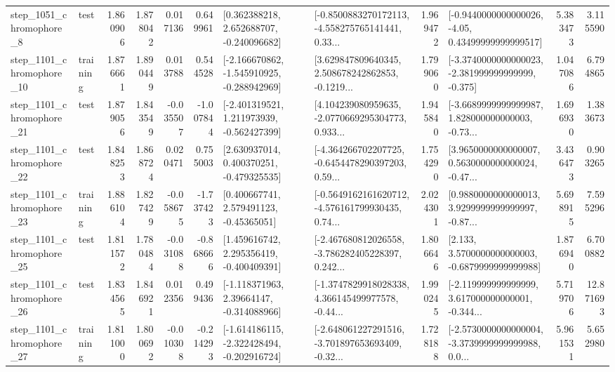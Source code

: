 \begin{tabular}{llrrrrllrlrr}
  step\_1051\_chromophore\_8 &      test &      1.860906 &    1.878042 &      0.017136 &  0.649961 &    [0.362388218, 2.652688707, -0.240096682] &  [-0.8500883270172113, -4.558275765141441, 0.33... &       1.969472 &  [-0.9440000000000026, -4.05, 0.43499999999999517] &            5.383473 &          3.115590 \\
 step\_1101\_chromophore\_10 &  training &      1.876661 &    1.890449 &      0.013788 &  0.544528 &  [-2.166670862, -1.545910925, -0.288942969] &  [3.629847809640345, 2.508678242862853, -0.1219... &       1.799060 &  [-3.3740000000000023, -2.381999999999999, -0.375] &            1.047086 &          6.794865 \\
 step\_1101\_chromophore\_21 &      test &      1.879056 &    1.843549 &     -0.035507 & -1.007844 &   [-2.401319521, 1.211973939, -0.562427399] &  [4.104239080959635, -2.0770669295304773, 0.933... &       1.945840 &  [-3.6689999999999987, 1.828000000000003, -0.73... &            1.696930 &          1.383673 \\
 step\_1101\_chromophore\_22 &      test &      1.848253 &    1.868724 &      0.020471 &  0.755003 &    [2.630937014, 0.400370251, -0.479325535] &  [-4.364266702207725, -0.6454478290397203, 0.59... &       1.754290 &  [3.9650000000000007, 0.5630000000000024, -0.47... &            3.436473 &          0.903265 \\
 step\_1101\_chromophore\_23 &  training &      1.886104 &    1.827429 &     -0.058675 & -1.737423 &     [0.400667741, 2.579491123, -0.45365051] &  [-0.5649162161620712, -4.576161799930435, 0.74... &       2.024301 &  [0.9880000000000013, 3.9299999999999997, -0.87... &            5.698915 &          7.595296 \\
 step\_1101\_chromophore\_25 &      test &      1.811572 &    1.780484 &     -0.031088 & -0.868666 &    [1.459616742, 2.295356419, -0.400409391] &  [-2.467680812026558, -3.786282405228397, 0.242... &       1.806646 &   [2.133, 3.5700000000000003, -0.6879999999999988] &            1.876940 &          6.700882 \\
 step\_1101\_chromophore\_26 &      test &      1.834565 &    1.846921 &      0.012356 &  0.499436 &    [-1.118371963, 2.39664147, -0.314088966] &  [-1.3747829918028338, 4.366145499977578, -0.44... &       1.990245 &  [-2.119999999999999, 3.617000000000001, -0.344... &            5.719706 &         12.871693 \\
 step\_1101\_chromophore\_27 &  training &      1.811000 &    1.800692 &     -0.010308 & -0.214293 &  [-1.614186115, -2.322428494, -0.202916724] &  [-2.648061227291516, -3.701897653693409, -0.32... &       1.728188 &  [-2.5730000000000004, -3.3739999999999988, 0.0... &            5.961531 &          5.652980 \\

\end{tabular}
